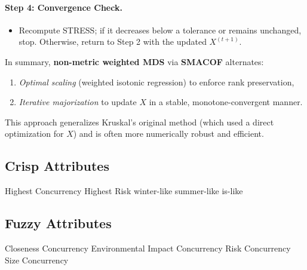 \paragraph{Step 4: Convergence Check.}
\begin{itemize}
  \item Recompute STRESS; if it decreases below a tolerance or remains unchanged, stop. Otherwise, return to Step 2 with the updated $X^{(t+1)}$.
\end{itemize}

\noindent
In summary, \textbf{non-metric weighted MDS} via \textbf{SMACOF} alternates:
\begin{enumerate}
  \item \emph{Optimal scaling} (weighted isotonic regression) to enforce rank preservation,
  \item \emph{Iterative majorization} to update $X$ in a stable, monotone-convergent manner.
\end{enumerate}
This approach generalizes Kruskal’s original method (which used a direct optimization for $X$) and is often more numerically robust and efficient.

\subsection{Crisp Attributes}
Highest Concurrency
Highest Risk %
winter-like
summer-like
is-like

\subsection{Fuzzy Attributes}
Closeness Concurrency
Environmental Impact Concurrency
Risk Concurrency %
Size Concurrency %
